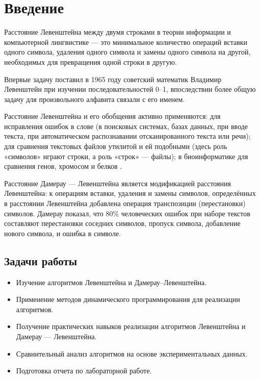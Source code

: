 \chapter*{Введение}

Расстояние Левенштейна между двумя строками в теории информации и компьютерной лингвистике --- это минимальное количество операций вставки одного символа, удаления одного символа и замены одного символа на другой, необходимых для превращения одной строки в другую.

Впервые задачу поставил в 1965 году советский математик Владимир Левенштейн \cite{Levenshtein} при изучении последовательностей 0--1, впоследствии более общую задачу для произвольного алфавита связали с его именем.

Расстояние Левенштейна и его обобщения активно применяются: для исправления ошибок в слове (в поисковых системах, базах данных, при вводе текста, при автоматическом распознавании отсканированного текста или речи); для сравнения текстовых файлов утилитой  и ей подобными (здесь роль «символов» играют строки, а роль «строк» — файлы); в биоинформатике для сравнения генов, хромосом и белков \cite{Gasfield}.

Расстояние Дамерау — Левенштейна является модификацией расстояния Левенштейна: к операциям вставки, удаления и замены символов, определённых в расстоянии Левенштейна добавлена операция транспозиции (перестановки) символов. Дамерау показал, что 80\% человеческих ошибок при наборе текстов составляют перестановки соседних символов, пропуск символа, добавление нового символа, и ошибка в символе.

\section*{Задачи работы}

\begin{itemize}
	\item Изучение алгоритмов Левенштейна и Дамерау--Левенштейна.
	\item Применение методов динамического программирования для реализации алгоритмов.
	\item Получение практических навыков реализации алгоритмов Левенштейна и Дамерау — Левенштейна.
	\item Сравнительный анализ алгоритмов на основе экспериментальных данных.
	\item Подготовка отчета по лабораторной работе.
\end{itemize}
